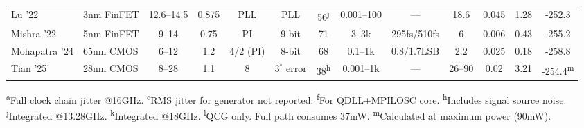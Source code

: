 \begin{table}[h]
{\begin{tabular}{@{}l l c S[table-format=1.2] c c c S[table-format=2.1] S[table-format=1.3] S[table-format=1.2] c S[table-format=-3.1] S[table-format=-3.1] @{}}
  Lu '22 \cite{Lu2022JSSC} & 3nm FinFET & 12.6--14.5 & 0.875 & PLL & PLL & 56\textsuperscript{j} & {0.001--100} & {---} & 18.6 & 0.045 & 1.28 & -252.3 \\

  Mishra '22 \cite{Mishra2022ISSCC} & 5nm FinFET & 9--14 & 0.75 & PI & 9-bit & 71 & {3--3k} & {295fs/510fs} & 6 & 0.006 & 0.43 & -255.2 \\

  Mohapatra '24 \cite{Mohapatra2024ISSCC} & 65nm CMOS & 6--12 & 1.2 & 4/2 (PI) & 8-bit & 68 & {0.1--1k} & {0.8/1.7LSB} & 2.2 & 0.025 & 0.18 & -258.8 \\

  Tian '25 \cite{Tian2025ISSCC} & 28nm CMOS & 8--28 & 1.1 & 8 & $3^{\circ}$ error & 38\textsuperscript{h} & {0.001--1k} & {---} & {26--90} & 0.02 & 3.21 & -254.4\textsuperscript{m} \\

  \bottomrule
 \end{tabular}
}
\vspace{0.5em}
\begin{minipage}{\textwidth}
\footnotesize
 \textsuperscript{a}Full clock chain jitter @16GHz.
 \textsuperscript{c}RMS jitter for generator not reported.
 \textsuperscript{f}For QDLL+MPILOSC core.
 \textsuperscript{h}Includes signal source noise.
 \textsuperscript{j}Integrated @13.28GHz.
 \textsuperscript{k}Integrated @18GHz.
 \textsuperscript{l}QCG only. Full path consumes 37mW.
 \textsuperscript{m}Calculated at maximum power (90mW).
\end{minipage}
\end{table}
